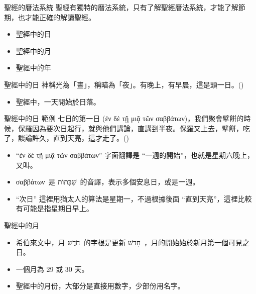 \documentclass{beamer}
\newcommand{\parvspace}{\par\vspace{0.5em}}
\begin{document}
\begin{frame}{聖經的曆法系統}
  聖經有獨特的曆法系統，只有了解聖經曆法系統，才能了解節期，也才能正確的解讀聖經。\parvspace
  \begin{itemize}
    \item 聖經中的日
    \item 聖經中的月
    \item 聖經中的年
  \end{itemize}
\end{frame}

\begin{frame}{聖經中的日}
  神稱光為「晝」，稱暗為「夜」。\alert{有晚上，有早晨}，這是頭一日。()\parvspace
  \begin{itemize}
    \item 聖經中，一天開始於日落\parencite{JewishDay}。
  \end{itemize}
\end{frame}

\begin{frame}{聖經中的日 \textemdash 範例}
  七日的第一日 (\textgreek{ἐν δὲ τῇ μιᾷ τῶν
  σαββάτων})，我們聚會擘餅的時候，保羅因為要次日起行，就與他們講論，直講到半夜。\textellipsis{}保羅又上去，擘餅，吃了，談論許久，直到天亮，這才走了。()\parvspace
  \begin{itemize}
    \item “\textgreek{ἐν δὲ τῇ μιᾷ τῶν σαββάτων}” 字面翻譯是
      “一週的開始”，也就是星期六晚上，又叫\textcite{MotzaeiShabbat}。
    \item \textgreek{σαββάτων}\ 是 \texthebrew{שַׁבָּתוֹת}\ 的音譯，表示多個安息日，或是一週。
    \item “次日” 這裡用猶太人的算法是星期一，不過根據後面 “直到天亮”，這裡比較有可能是指星期日早上。
  \end{itemize}
\end{frame}

\begin{frame}{聖經中的月}
  \begin{itemize}
    \item 希伯來文中，月 \texthebrew{חֹדֶשׁ}\ 的字根是更新
      \texthebrew{חָדַשׁ}\ ，月的開始始於\alert{新月第一個可見之日}。
    \item 一個月為 \alert{29 或 30 天}。
    \item 聖經中的月份，大部分是直接用數字，少部份用名字。
  \end{itemize}
\end{frame}
\end{document}
